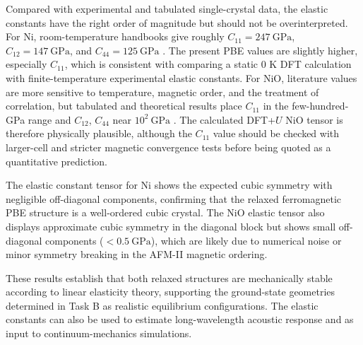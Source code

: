 Compared with experimental and tabulated single-crystal data, the elastic
constants have the right order of magnitude but should not be overinterpreted.
For Ni, room-temperature handbooks give roughly \(C_{11}=247~\mathrm{GPa}\),
\(C_{12}=147~\mathrm{GPa}\), and \(C_{44}=125~\mathrm{GPa}\)
\cite{simmons-wang}.  The present PBE values are slightly higher, especially
\(C_{11}\), which is consistent with comparing a static 0 K DFT calculation
with finite-temperature experimental elastic constants.  For NiO, literature
values are more sensitive to temperature, magnetic order, and the treatment of
correlation, but tabulated and theoretical results place \(C_{11}\) in the
few-hundred-GPa range and \(C_{12}\), \(C_{44}\) near
\(10^2~\mathrm{GPa}\) \cite{simmons-wang,dudarev,mp-nio}.  The calculated
DFT+\(U\) NiO tensor is therefore physically plausible, although the
\(C_{11}\) value should be checked with larger-cell and stricter magnetic
convergence tests before being quoted as a quantitative prediction.

The elastic constant tensor for Ni shows the expected cubic symmetry with
negligible off-diagonal components, confirming that the relaxed ferromagnetic
PBE structure is a well-ordered cubic crystal.  The NiO elastic tensor also
displays approximate cubic symmetry in the diagonal block but shows small
off-diagonal components ($< 0.5~\mathrm{GPa}$), which are likely due to
numerical noise or minor symmetry breaking in the AFM-II magnetic ordering.

These results establish that both relaxed structures are mechanically stable
according to linear elasticity theory, supporting the ground-state geometries
determined in Task B as realistic equilibrium configurations.  The elastic
constants can also be used to estimate long-wavelength acoustic response and as
input to continuum-mechanics simulations.
